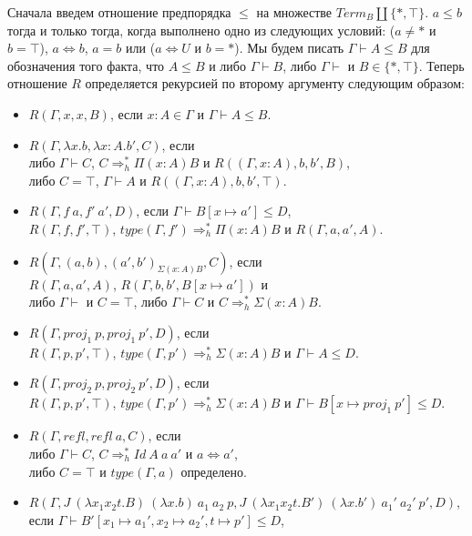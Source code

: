\documentclass{amsart}
\theoremstyle{definition}
\theoremstyle{remark}
\newcommand{\red}{\Rightarrow}
\newcommand{\deq}{\Leftrightarrow}
\numberwithin{figure}{section}
\begin{document}
Сначала введем отношение предпорядка $\leq$ на множестве $Term_B \amalg \{ *, \top \}$. $a \leq b$ тогда и только тогда, когда выполнено одно из следующих условий: ($a \neq *$ и $b = \top$), $a \deq b$, $a = b$ или ($a \deq U$ и $b = *$).
Мы будем писать $\Gamma \vdash A \leq B$ для обозначения того факта, что $A \leq B$ и либо $\Gamma \vdash B$, либо $\Gamma \vdash$ и $B \in \{ *, \top \}$.
Теперь отношение $R$ определяется рекурсией по второму аргументу следующим образом:
\begin{itemize}
\item $R(\Gamma, x, x, B)$, если $x : A \in \Gamma$ и $\Gamma \vdash A \leq B$.
\item $R(\Gamma, \lambda x. b, \lambda x : A. b', C)$, если \\
    либо $\Gamma \vdash C$, $C \red_h^* \Pi (x : A) B$ и $R((\Gamma, x : A), b, b', B)$, \\
    либо $C = \top$, $\Gamma \vdash A$ и $R((\Gamma, x : A), b, b', \top)$.
\item $R(\Gamma, f\ a, f'\ a', D)$, если $\Gamma \vdash B[x \mapsto a'] \leq D$, \\
    $R(\Gamma, f, f', \top)$, $type(\Gamma, f') \red_h^* \Pi (x : A) B$ и $R(\Gamma, a, a', A)$.
\item $R(\Gamma, (a, b), (a', b')_{\Sigma (x : A) B}, C)$, если \\
    $R(\Gamma, a, a', A)$, $R(\Gamma, b, b', B[x \mapsto a'])$ и \\
    либо $\Gamma \vdash$ и $C = \top$, либо $\Gamma \vdash C$ и $C \red_h^* \Sigma (x : A) B$.
\item $R(\Gamma, proj_1\ p, proj_1\ p', D)$, если \\
    $R(\Gamma, p, p', \top)$, $type(\Gamma, p') \red_h^* \Sigma (x : A) B$ и $\Gamma \vdash A \leq D$.
\item $R(\Gamma, proj_2\ p, proj_2\ p', D)$, если \\
    $R(\Gamma, p, p', \top)$, $type(\Gamma, p') \red_h^* \Sigma (x : A) B$ и $\Gamma \vdash B[x \mapsto proj_1\ p'] \leq D$.
\item $R(\Gamma, refl, refl\ a, C)$, если \\
    либо $\Gamma \vdash C$, $C \red_h^* Id\ A\ a\ a'$ и $a \deq a'$, \\
    либо $C = \top$ и $type(\Gamma, a)$ определено.
\item $R(\Gamma, J\ (\lambda x_1 x_2 t. B)\ (\lambda x. b)\ a_1\ a_2\ p, J\ (\lambda x_1 x_2 t. B')\ (\lambda x. b')\ a_1'\ a_2'\ p', D)$, если
    $\Gamma \vdash B'[x_1 \mapsto a_1', x_2 \mapsto a_2', t \mapsto p'] \leq D$, \\

\end{itemize}
\end{document}
